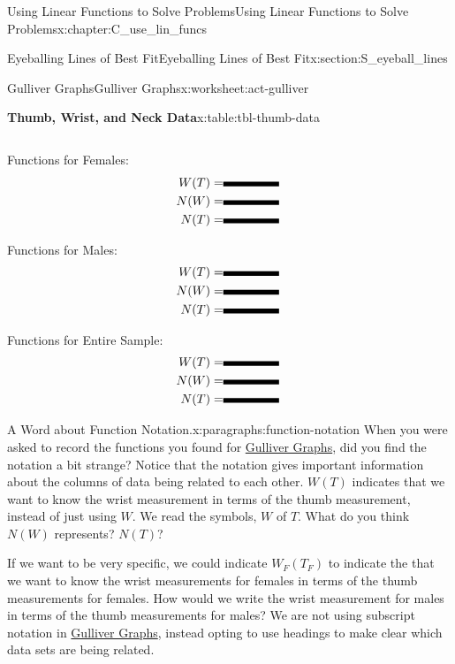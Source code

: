 \documentclass[oneside,10pt,]{book}
\newcommand{\fillin}[1]{\leavevmode\leaders\vrule height -1.2pt depth 1.5pt \hskip #1em minus #1em \null}
\numberwithin{equation}{chapter}
\newcommand{\amp}{&}
\begin{document}
\begin{chapterptx}{Using Linear Functions to Solve Problems}{}{Using Linear Functions to Solve Problems}{}{}{x:chapter:C_use_lin_funcs}
\begin{sectionptx}{Eyeballing Lines of Best Fit}{}{Eyeballing Lines of Best Fit}{}{}{x:section:S_eyeball_lines}
\begin{worksheet-subsection}{Gulliver Graphs}{}{Gulliver Graphs}{}{}{x:worksheet:act-gulliver}
\begin{tableptx}{\textbf{Thumb, Wrist, and Neck Data}}{x:table:tbl-thumb-data}{}
{\begin{tabular}{Acccccc}
\end{tabular}
}%
\end{tableptx}%
\begin{sidebyside}{3}{0}{0}{0}%
\begin{sbspanel}{0.333333333333333}%
Functions for Females:%
\begin{align*}
W(T) \amp = \fillin{4.545454545454546}\\
N(W) \amp = \fillin{4.545454545454546}\\
N(T) \amp = \fillin{4.545454545454546}
\end{align*}
%
\end{sbspanel}%
\begin{sbspanel}{0.333333333333333}%
\par
Functions for Males:%
\begin{align*}
W(T) \amp = \fillin{4.545454545454546}\\
N(W) \amp = \fillin{4.545454545454546}\\
N(T) \amp = \fillin{4.545454545454546}
\end{align*}
%
\end{sbspanel}%
\begin{sbspanel}{0.333333333333333}%
\par
Functions for Entire Sample:%
\begin{align*}
W(T) \amp = \fillin{4.545454545454546}\\
N(W) \amp = \fillin{4.545454545454546}\\
N(T) \amp = \fillin{4.545454545454546}
\end{align*}
%
\end{sbspanel}%
\end{sidebyside}%
\begin{paragraphs}{A Word about Function Notation.}{x:paragraphs:function-notation}%
When you were asked to record the functions you found for \hyperref[x:worksheet:act-gulliver]{Gulliver Graphs}, did you find the notation a bit strange? Notice that the notation gives important information about the columns of data being related to each other. \(W(T)\) indicates that we want to know the wrist measurement in terms of the thumb measurement, instead of just using \(W\). We read the symbols, \(W\) of \(T\). What do you think \(N(W)\) represents? \(N(T)\)?%
\par
If we want to be very specific, we could indicate \(W_F(T_F)\) to indicate the that we want to know the wrist measurements for females in terms of the thumb measurements for females. How would we write the wrist measurement for males in terms of the thumb measurements for males? We are not using subscript notation in \hyperref[x:worksheet:act-gulliver]{Gulliver Graphs}, instead opting to use headings to make clear which data sets are being related.%

\end{paragraphs}
\end{worksheet-subsection}
\end{sectionptx}
\end{chapterptx}
\end{document}
